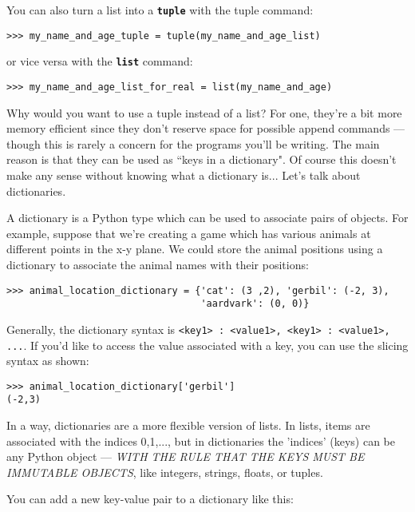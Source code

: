 You can also turn a list into a \texttt{\textbf{tuple}} with the tuple command:

\begin{lstlisting}[numbers=none]
>>> my_name_and_age_tuple = tuple(my_name_and_age_list)
\end{lstlisting}

or vice versa with the \texttt{\textbf{list}} command:

\begin{lstlisting}[numbers=none]
>>> my_name_and_age_list_for_real = list(my_name_and_age)
\end{lstlisting}

Why would you want to use a tuple instead of a list? For one, they're a bit more memory efficient since they don't reserve space for possible append commands --- though this is rarely a concern for the programs you'll be writing. The main reason is that they can be used as ``keys in a dictionary". Of course this doesn't make any sense without knowing what a dictionary is... Let's talk about dictionaries.

A dictionary is a Python type which can be used to associate pairs of objects. For example, suppose that we're creating a game which has various animals at different points in the x-y plane. We could store the animal positions using a dictionary to associate the animal names with their positions:

\begin{lstlisting}[numbers=none]
>>> animal_location_dictionary = {'cat': (3 ,2), 'gerbil': (-2, 3), 
						          'aardvark': (0, 0)}
\end{lstlisting}

Generally, the dictionary syntax is \texttt{{<key1> : <value1>, <key1> : <value1>, ...}}. If you'd like to access the value associated with a key, you can use the slicing syntax as shown:

\begin{lstlisting}[numbers=none]
>>> animal_location_dictionary['gerbil']
(-2,3)
\end{lstlisting}

In a way, dictionaries are a more flexible version of lists. In lists, items are associated with the indices 0,1,..., but in dictionaries the 'indices' (keys) can be any Python object --- \emph{WITH THE RULE THAT THE KEYS MUST BE IMMUTABLE OBJECTS}, like integers, strings, floats, or tuples.

You can add a new key-value pair to a dictionary like this:

